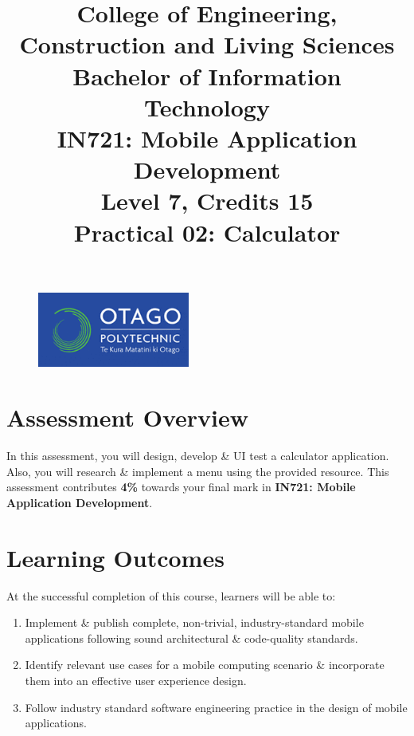 \documentclass{article}
\author{}
\begin{document}
\begin{figure}
	\centering
	\includegraphics[width=50mm]{./img/logo.png}
\end{figure}

\title{College of Engineering, Construction and Living Sciences\\Bachelor of Information Technology\\IN721: Mobile Application Development\\Level 7, Credits 15\\\textbf{Practical 02: Calculator}}
\date{}
\maketitle

\section*{Assessment Overview}
In this assessment, you will design, develop \& UI test a calculator application. Also, you will research \& implement a menu using the provided resource. This assessment contributes \textbf{4\%} towards your final mark in \textbf{IN721: Mobile Application Development}.

\section*{Learning Outcomes}
At the successful completion of this course, learners will be able to:
\begin{enumerate}
	\item Implement \& publish complete, non-trivial, industry-standard mobile applications following sound architectural \& code-quality standards.
	\item Identify relevant use cases for a mobile computing scenario \& incorporate them into an effective user experience design.
	\item Follow industry standard software engineering practice in the design of mobile applications.
\end{enumerate}
\end{document}
